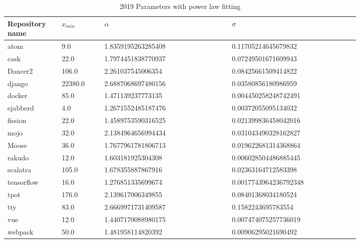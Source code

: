 \documentclass[conference]{IEEEtran}
\begin{document}
\begin{table}[htbp]
	\caption{2019 Parameters with power law fitting}
	\begin{center}
		\begin{tabular}{| p{0.12\linewidth} | p{0.1\linewidth} | p{0.3\linewidth} | p{0.3\linewidth} |}
	\hline
	Repository name &$x_{min}$ & $\alpha$ & $\sigma$\\
	\hline
atom  &9.0  &1.8359195263285408  &0.11705214645679832 \\
cask  &22.0   &1.7974451838770937  &0.07249501671609943 \\
Dancer2  &106.0   &2.261037545006354  &0.08425661509414822 \\
django  &22380.0   &2.6887068697480156  &0.03580856180986959\\
docker  &85.0  &1.471139237773135  &0.004450258248742491 \\
ejabberd  &4.0   &1.2671552485187476  &0.00372055095134032 \\
fission  &22.0   &1.4589753590316525  &0.021399836458042016\\ 
mojo  &32.0   &2.1384964656994434  &0.031043490328162827 \\
Moose  &36.0   &1.7677961781806713  &0.019622681314368864 \\
rakudo  &12.0   &1.603181925304308  &0.006028504486885445 \\
scalatra  &105.0  &1.678355887867916  &0.02363164712583398 \\
tensorflow  &16.0  & 1.276851335699674  & 0.0017743964236792348 \\
tpot  &176.0   &2.139617006349855  &0.08401368034180524 \\
tty  &83.0   &2.6669971731409587  &0.1582243695783554 \\
vue  &12.0   &1.4407170088980175  &0.007474075257736019 \\
webpack &50.0  &1.481958114820392  &0.00906295021690492 \\
			\hline
		\end{tabular}
	\end{center}
\label{tab:2019pars}
\end{table}
\end{document}

